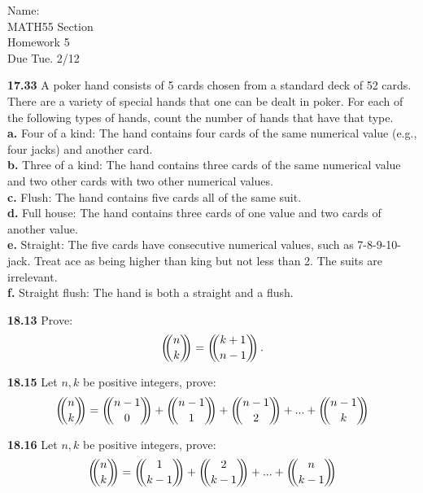 \documentclass[10pt]{article}
\def\multichoose#1#2{ \left(\kern-.4em\binom{#1}{#2}\kern-.4em\right) }
\begin{document}
\begin{flushright}
	Name: \underline{\hspace{3cm}} \\
	MATH55 Section \underline{\hspace{0.5cm}} \\
	Homework 5 \\
	Due Tue. 2/12
\end{flushright}

\begin{framed}
    \textbf{17.33} A poker hand consists of 5 cards chosen from a standard deck of 52 cards.
    There are a variety of special hands that one can be dealt in poker. For
    each of the following types of hands, count the number of hands that have that type.\\

    \indent \textbf{a.} Four of a kind: The hand contains four cards of the same numerical value (e.g., four
    jacks) and another card.\\
    \indent \textbf{b.} Three of a kind: The hand contains three cards of the same numerical value and two
    other cards with two other numerical values.\\
    \indent \textbf{c.} Flush: The hand contains five cards all of the same suit.\\
    \indent \textbf{d.} Full house: The hand contains three cards of one value and two cards of another value.\\
    \indent \textbf{e.} Straight: The five cards have consecutive numerical values, such as 7-8-9-10-jack.
    Treat ace as being higher than king but not less than 2. The suits are irrelevant.\\
    \indent \textbf{f.} Straight flush: The hand is both a straight and a flush.
\end{framed}

\pagebreak

\begin{framed}
    \textbf{18.13} Prove:
    $$
        \multichoose{n}{k} = \multichoose{k+1}{n-1}.
    $$
\end{framed}

\pagebreak

\begin{framed}
    \textbf{18.15} Let $n, k$ be positive integers, prove:
    $$
    \multichoose{n}{k} = \multichoose{n-1}{0} + \multichoose{n-1}{1}
    + \multichoose{n-1}{2} + ...  + \multichoose{n-1}{k}
    $$
\end{framed}

\pagebreak

\begin{framed}
    \textbf{18.16} Let $n,k$ be positive integers, prove:
    $$
    \multichoose{n}{k} = \multichoose{1}{k-1} + \multichoose{2}{k-1}
    +  ...  + \multichoose{n}{k-1}
    $$
\end{framed}
\end{document}
